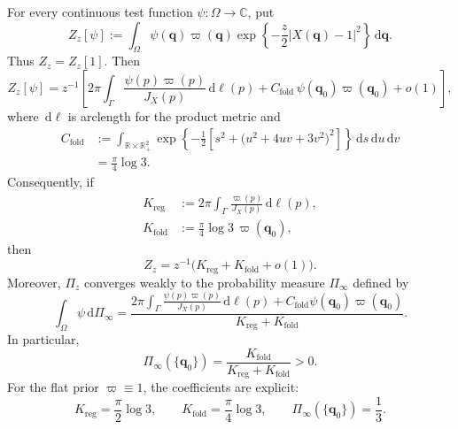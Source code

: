 \documentclass[10pt,a4paper]{amsart}
\newcommand{\C}{\mathbb{C}}
\newcommand{\R}{\mathbb{R}}
\newcommand{\dd}{\,\mathrm{d}}
\begin{document}
\begin{proposition}\label{prop:robot-posterior-splitting}
For every continuous test function $\psi:\Omega\to\C$, put
\[
 Z_z[\psi]:=\int_\Omega
 \psi(\bm q)\varpi(\bm q)
 \exp\left\{-\frac z2|X(\bm q)-1|^2\right\}\dd \bm q.
\]
Thus $Z_z=Z_z[1]$.  Then
\begin{equation}\label{eq:robot-test-asymptotic}
 Z_z[\psi]=z^{-1}\left[
 2\pi\int_\Gamma
 \frac{\psi(p)\varpi(p)}{J_X(p)}\dd\ell(p)
 +C_{\mathrm{fold}}\,\psi(\bm q_0)\varpi(\bm q_0)
 +o(1)\right],
\end{equation}
where $\dd\ell$ is arclength for the product metric and
\begin{equation}\label{eq:robot-fold-constant}
 \begin{split}
 C_{\mathrm{fold}}
 &:=\int_{\R\times\R_+^2}
 \exp\left\{-\frac12\left[
 s^2+\bigl(u^2+4uv+3v^2\bigr)^2
 \right]\right\}\dd s\dd u\dd v\\
 &=\frac{\pi}{4}\log 3.
 \end{split}
\end{equation}
Consequently, if
\begin{align}
 K_{\mathrm{reg}}
 &:=2\pi\int_\Gamma
 \frac{\varpi(p)}{J_X(p)}\dd\ell(p),
 \label{eq:robot-Kreg}\\
 K_{\mathrm{fold}}
 &:=\frac{\pi}{4}\log 3\,\varpi(\bm q_0),
 \label{eq:robot-Kfold}
\end{align}
then
\begin{equation}\label{eq:robot-evidence}
 Z_z=z^{-1}\bigl(K_{\mathrm{reg}}+K_{\mathrm{fold}}+o(1)\bigr).
\end{equation}
Moreover, $\Pi_z$ converges weakly to the probability measure $\Pi_\infty$
defined by
\begin{equation}\label{eq:robot-weak-limit}
 \int_\Omega\psi\dd\Pi_\infty
 =\frac{
 \displaystyle
 2\pi\int_\Gamma
 \frac{\psi(p)\varpi(p)}{J_X(p)}\dd\ell(p)
 +C_{\mathrm{fold}}\psi(\bm q_0)\varpi(\bm q_0)}
 {K_{\mathrm{reg}}+K_{\mathrm{fold}}}.
\end{equation}
In particular,
\begin{equation}\label{eq:robot-atom-mass}
 \Pi_\infty(\{\bm q_0\})
 =\frac{K_{\mathrm{fold}}}
 {K_{\mathrm{reg}}+K_{\mathrm{fold}}}>0.
\end{equation}
For the flat prior $\varpi\equiv1$, the coefficients are explicit:
\begin{equation}\label{eq:robot-flat-prior-coefficients}
 K_{\mathrm{reg}}=\frac{\pi}{2}\log3,
 \qquad
 K_{\mathrm{fold}}=\frac{\pi}{4}\log3,
 \qquad
 \Pi_\infty(\{\bm q_0\})=\frac13.
\end{equation}
\end{proposition}
\end{document}
